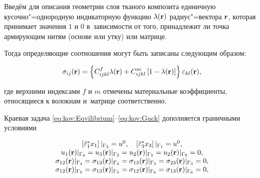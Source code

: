 Введём для описания геометрии слоя тканого композита единичную кусочно"=однородную индикаторную функцию $\lambda({\bf r})$ радиус"=вектора ${\bf r}$, которая принимает значения $1$ и $0$ в~зависимости от того, принадлежит ли точка армирующим нитям (основе или утку) или матрице. 

Тогда определяющие соотношения могут быть записаны следующим образом:

\begin{equation}

\sigma_{ij} ({\bf r}) = \left\{ C_{ijkl}^{f}\lambda({\bf r}) +

C_{ijkl}^{m} \left[ 1-\lambda({\bf r}) \right ] \right\}

\varepsilon_{kl}({\bf r}), \label{eq:kov:Guck}

\end{equation}

\noindent где верхними индексами $f$ и $m$ отмечены материальные коэффициенты, относящиеся к волокнам и~матрице соответственно.



Краевая задача \eqref{eq:kov:Eqvilibrium}--\eqref{eq:kov:Guck} дополняется граничными условиями

\begin{equation}  

\begin{array}{c}

\left[\hat{\varepsilon}^{*}_1 x_1 \right] |_{\Gamma_2} =

u^0, \quad \left[\hat{\varepsilon}^{*}_3 x_3 \right] |_{\Gamma_1} =

u^0, \\

u_1 {\bf (r)}|_{\Gamma_4} = u_3 {\bf (r)}|_{\Gamma_3} = u_2

{\bf (r)}|_{\Gamma_5} = u_2 {\bf (r)}|_{\Gamma_6} = 0,

\\

\sigma_{12} {\bf (r)}|_{\Gamma_4} = \sigma_{13} {\bf (r)}|_{\Gamma_4} =

 \sigma_{13} {\bf (r)}|_{\Gamma_3} = \sigma_{23} {\bf (r)}|_{\Gamma_3} =

 0,

\\

\sigma_{12} {\bf (r)}|_{\Gamma_5} = \sigma_{13} {\bf (r)}|_{\Gamma_5} =

 \sigma_{12} {\bf (r)}|_{\Gamma_6} = \sigma_{13} {\bf (r)}|_{\Gamma_6} =

 0,

 \end{array}

\label{eq:kov:b_cond}

\end{equation}

